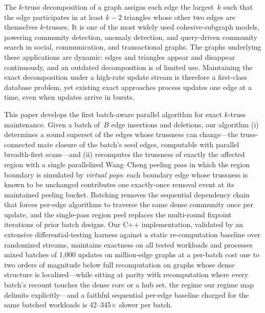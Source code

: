 The $k$-truss decomposition of a graph assigns each edge the largest~$k$ such that the edge participates in at least $k-2$ triangles whose other two edges are themselves $k$-trusses.
It is one of the most widely used cohesive-subgraph models, powering community detection, anomaly detection, and query-driven community search in social, communication, and transactional graphs.
The graphs underlying these applications are dynamic: edges and triangles appear and disappear continuously, and an outdated decomposition is of limited use.
Maintaining the exact decomposition under a high-rate update stream is therefore a first-class database problem, yet existing exact approaches process updates one edge at a time, even when updates arrive in bursts.

This paper develops the first batch-aware parallel algorithm for exact $k$-truss maintenance.
Given a batch of~$B$ edge insertions and deletions, our algorithm (i) determines a sound superset of the edges whose trussness can change---the truss-connected mate closure of the batch's seed edges, computable with parallel breadth-first scans---and (ii) recomputes the trussness of exactly the affected region with a single parallelized Wang--Cheng peeling pass in which the region boundary is simulated by \emph{virtual pops}: each boundary edge whose trussness is known to be unchanged contributes one exactly-once removal event at its maintained peeling bucket.
Batching removes the sequential dependency chain that forces per-edge algorithms to traverse the same dense community once per update, and the single-pass region peel replaces the multi-round fixpoint iterations of prior batch designs.
Our C++ implementation, validated by an extensive differential-testing harness against a static re-computation baseline over randomized streams, maintains exactness on all tested workloads and processes mixed batches of 1{,}000 updates on million-edge graphs at a per-batch cost one to two orders of magnitude below full recomputation on graphs whose dense structure is localized---while sitting at parity with recomputation where every batch's recount touches the dense core or a hub set, the regime our regime map delimits explicitly---and a faithful sequential per-edge baseline charged for the same batched workloads is 42--345$\times$ slower per batch.
